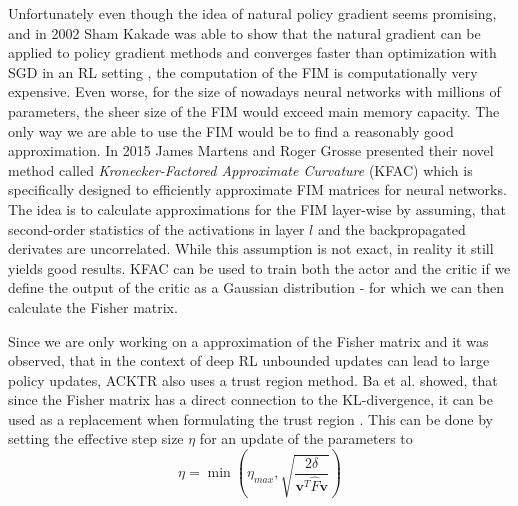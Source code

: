 Unfortunately even though the idea of natural policy gradient seems promising, and in 2002 Sham Kakade was able to show that the natural gradient can be applied to policy gradient methods and converges faster than optimization with SGD in an RL setting \cite{kakade2002natural}, the computation of the FIM is computationally very expensive. Even worse, for the size of nowadays neural networks with millions of parameters, the sheer size of the FIM would exceed main memory capacity. The only way we are able to use the FIM would be to find a reasonably good approximation. In 2015 James Martens and Roger Grosse presented their novel method called \textit{Kronecker-Factored Approximate Curvature} (KFAC) \cite{martens2015optimizing} which is specifically designed to efficiently approximate FIM matrices for neural networks. The idea is to calculate approximations for the FIM layer-wise by assuming, that second-order statistics of the activations in layer $l$ and the backpropagated derivates are uncorrelated. While this assumption is not exact, in reality it still yields good results. KFAC can be used to train both the actor and the critic if we define the output of the critic as a Gaussian distribution - for which we can then calculate the Fisher matrix. 



Since we are only working on a approximation of the Fisher matrix and it was observed, that in the context of deep RL unbounded updates can lead to large policy updates, ACKTR also uses a trust region method. Ba et al. showed, that since the Fisher matrix has a direct connection to the KL-divergence, it can be used as a replacement when formulating the trust region \cite{ba2016distributed}. This can be done by setting the effective step size $\eta$ for an update of the parameters to 
\[\eta = \min\left(\eta_{max}, \sqrt{\frac{2\delta}{\mathbf{v}^T\hat{F}\mathbf{v}}}\right)\]


